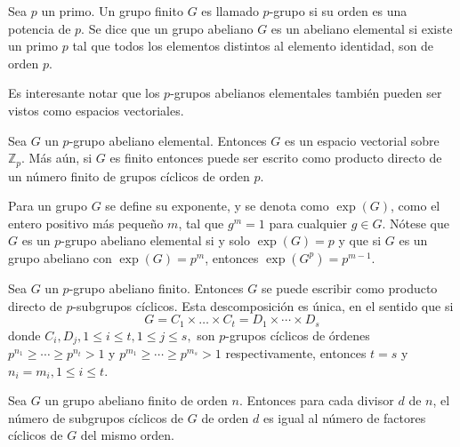 \begin{definicion}
Sea $p$ un primo. Un grupo finito $G$ es llamado $p$-grupo si su orden es una potencia de $p$.
Se dice que un grupo abeliano $G$ es un abeliano elemental si existe un primo $p$ tal que todos los elementos distintos al elemento identidad, son de orden $p$.
\end{definicion}
Es interesante notar que los $p$-grupos abelianos elementales también pueden ser vistos como espacios vectoriales.
\begin{lema}
Sea $G$ un $p$-grupo abeliano elemental. Entonces $G$ es un espacio vectorial sobre $\mathds{Z}_p$. Más aún, si $G$ es finito entonces puede ser escrito como producto directo de un número finito de grupos cíclicos de orden $p$.

\end{lema}
Para un grupo $G$ se define su exponente, y se denota como $\exp(G)$, como el entero positivo más pequeño $m$, tal que $g^m=1$ para cualquier $g \in G$. Nótese que $G$ es un $p$-grupo abeliano elemental si y solo $\exp(G)=p$ y que si $G$ es un grupo abeliano con $\exp(G) = p^m$, entonces $\exp(G^p) = p^{m-1}$.
\begin{teorema}\label{teo:estructuraAbelianos}
Sea $G$ un $p$-grupo abeliano finito. Entonces $G$ se puede escribir como producto directo de $p$-subgrupos cíclicos. Esta descomposición es única, en el sentido que si
\[ G = C_1 \times \dots \times C_t = D_1 \times \cdots \times D_s \]
donde $C_i,D_j, 1\leq i \leq t, 1\leq j \leq s,$ son $p$-grupos cíclicos de órdenes $p^{n_1} \geq \cdots \geq p^{n_t}>1$ y $p^{m_1}\geq \cdots \geq p^{m_s}>1$ respectivamente, entonces $t=s$ y $n_i = m_i, 1\leq i \leq t$.
\end{teorema} 
\begin{proposicion}
Sea $G$ un grupo abeliano finito de orden $n$. Entonces para cada divisor $d$ de $n$, el número de subgrupos cíclicos de $G$ de orden $d$ es igual al número de factores cíclicos de $G$ del mismo orden.
\end{proposicion}

